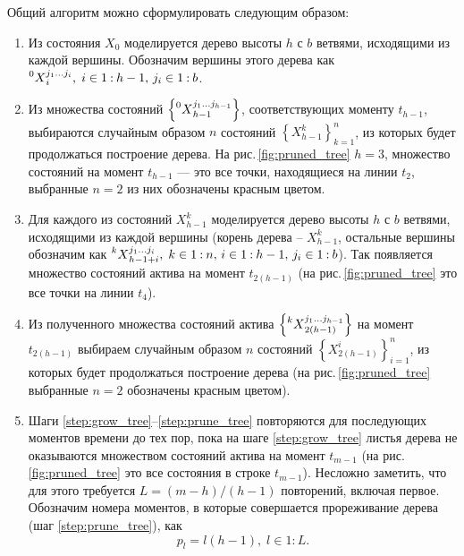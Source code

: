 Общий алгоритм можно сформулировать следующим образом:

\begin{enumerate}[noitemsep]
	\item Из состояния $X_0$ моделируется дерево высоты $h$ с $b$ ветвями, исходящими из каждой вершины. Обозначим вершины этого дерева как $\prescript{0}{}{X}_i^{j_1\dots j_i},\; i\in{1\mathbin{:}{h-1}},\,j_i\in{1\mathbin{:}b}$.
	\item Из 
	множества состояний $\left\{\prescript{0}{}{X}_{h-1}^{j_1\dots j_{h-1}}\right\}$, соответствующих моменту $t_{h-1}$, выбираются случайным образом $n$ состояний $\left\{X_{h-1}^k\right\}_{k=1}^n$, из которых будет продолжаться построение дерева. На рис.\,\ref{fig:pruned_tree} $h=3$, множество состояний на момент $t_{h-1}$ --- это все точки, находящиеся на линии $t_2$, выбранные $n=2$ из них обозначены красным цветом.
	
	\item\label{step:grow_tree} Для каждого из состояний $X_{h-1}^k$ моделируется дерево высоты $h$ с $b$ ветвями, исходящими из каждой вершины (корень дерева -- $X_{h-1}^k$, остальные вершины обозначим как $\prescript{k}{}{X}_{h-1+i}^{j_1\dots j_i},\; k\in{1\mathbin{:}n},\,i\in{1\mathbin{:}{h-1}},\,j_i\in{1\mathbin{:}b}$). Так появляется множество состояний актива на момент $t_{2(h-1)}$ (на рис.\,\ref{fig:pruned_tree} это все точки на линии $t_4$).
	
	\item\label{step:prune_tree} Из полученного множества состояний актива $\left\{\prescript{k}{}{X}_{2(h-1)}^{j_1\dots j_{h-1}}\right\}$ на момент $t_{2(h-1)}$ выбираем случайным образом $n$ состояний $\left\{X_{2(h-1)}^i\right\}_{i=1}^n$, из которых будет продолжаться построение дерева (на рис.\,\ref{fig:pruned_tree} выбранные $n=2$ обозначены красным цветом).
	
	\item Шаги \ref{step:grow_tree}--\ref{step:prune_tree} повторяются для последующих моментов времени до тех пор, пока на шаге \ref{step:grow_tree} листья дерева не оказываются множеством состояний актива на момент $t_{m-1}$ (на рис.\,\ref{fig:pruned_tree} это все состояния в строке $t_{m-1}$). Несложно заметить, что для этого требуется $L = (m-h) / (h-1)$ повторений, включая первое. Обозначим номера моментов, в которые совершается прореживание дерева (шаг \ref{step:prune_tree}), как $$p_l = l(h-1),\;l\in{1\mathbin{:}L}.$$


\end{enumerate}
